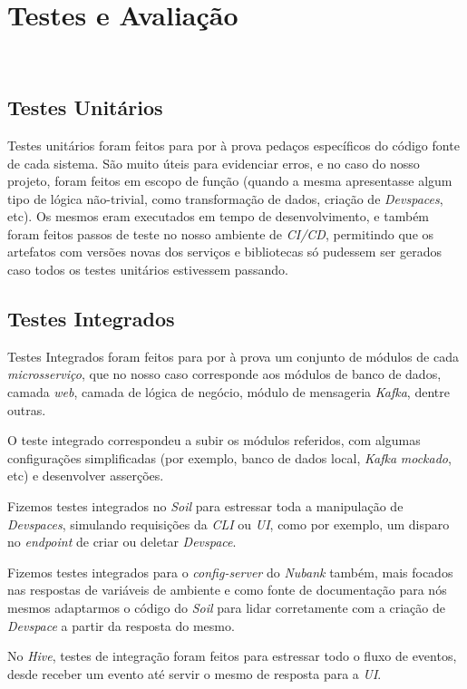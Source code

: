 \chapter{Testes e Avaliação}\
    \section{Testes Unitários}
        Testes unitários foram feitos para por à prova pedaços específicos do código fonte de cada sistema. São muito úteis para evidenciar erros, e no caso do nosso projeto, foram feitos em escopo de função (quando a mesma apresentasse algum tipo de lógica não-trivial, como transformação de dados, criação de \textit{Devspaces}, etc). Os mesmos eram executados em tempo de desenvolvimento, e também foram feitos passos de teste no nosso ambiente de \textit{CI/CD}, permitindo que os artefatos com versões novas dos serviços e bibliotecas só pudessem ser gerados caso todos os testes unitários estivessem passando.
    
    \section{Testes Integrados}
        Testes Integrados foram feitos para por à prova um conjunto de módulos de cada \textit{microsserviço}, que no nosso caso corresponde aos módulos de banco de dados, camada \textit{web}, camada de lógica de negócio, módulo de mensageria \textit{Kafka}, dentre outras. 
        
        O teste integrado correspondeu a subir os módulos referidos, com algumas configurações simplificadas (por exemplo, banco de dados local, \textit{Kafka} \textit{mockado}, etc) e desenvolver asserções.
        
        Fizemos testes integrados no \textit{Soil} para estressar toda a manipulação de \textit{Devspaces}, simulando requisições da \textit{CLI} ou \textit{UI}, como por exemplo, um disparo no \textit{endpoint} de criar ou deletar \textit{Devspace}. 
        
        Fizemos testes integrados para o \textit{config-server} do \textit{Nubank} também, mais focados nas respostas de variáveis de ambiente e como fonte de documentação para nós mesmos adaptarmos o código do \textit{Soil} para lidar corretamente com a criação de \textit{Devspace} a partir da resposta do mesmo.
        
        No \textit{Hive}, testes de integração foram feitos para estressar todo o fluxo de eventos, desde receber um evento até servir o mesmo de resposta para a \textit{UI}.
    
